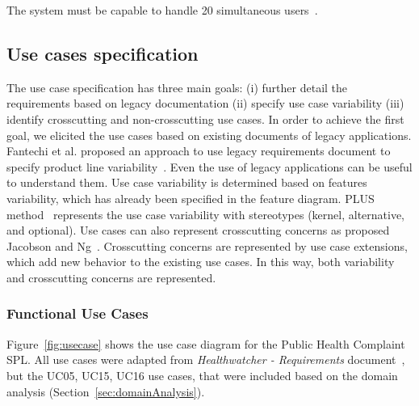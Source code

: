 \documentclass[11pt,twoside]{article}
\begin{document}
The system must be capable to handle 20 simultaneous users~\cite{hw-aore}.


\subsection{Use cases specification}
\label{sec:useCases}

The use case specification has three main goals: (i) further detail the requirements based on legacy documentation (ii) specify use case
variability (iii) identify crosscutting and non-crosscutting use cases. In order to achieve the first goal, we elicited the use
cases based on existing documents of legacy applications. Fantechi et al. proposed an approach to use legacy requirements
document to specify product line variability~\cite{Fantechi:2004:EUC}. Even the use of legacy applications can be useful to understand them. 
Use case variability is determined based on features variability, which has already been specified in the feature diagram. PLUS
method~\cite{Gomaa:2004:DSP} represents the use case variability with stereotypes (kernel, alternative, and optional). Use cases can also represent
crosscutting concerns as proposed Jacobson and Ng~\cite[Chapter 6.2]{Jacobson:2004:ASD}. Crosscutting concerns are
represented by use case extensions, which add new behavior to the existing use cases. In this way, both variability and crosscutting concerns are
represented.

\subsubsection{Functional Use Cases}

Figure~\ref{fig:usecase} shows the use case diagram for the Public Health Complaint SPL. All use cases were adapted from \textit{Healthwatcher -
Requirements} document~\cite{hw-usecase}, but the UC05, UC15, UC16 use cases, that were included based on the domain analysis
(Section~\ref{sec:domainAnalysis}).
\end{document}
